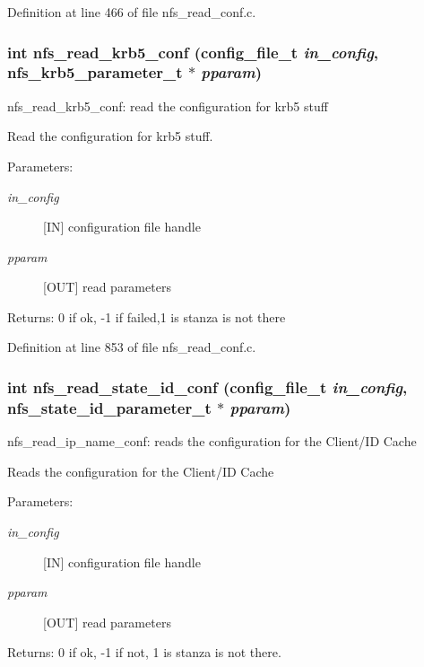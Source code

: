 Definition at line 466 of file nfs\_\-read\_\-conf.c.
\subsubsection{\setlength{\rightskip}{0pt plus 5cm}int nfs\_\-read\_\-krb5\_\-conf (config\_\-file\_\-t {\em in\_\-config}, nfs\_\-krb5\_\-parameter\_\-t $\ast$ {\em pparam})}\label{nfs__read__conf_8c_a8}


nfs\_\-read\_\-krb5\_\-conf: read the configuration for krb5 stuff

Read the configuration for krb5 stuff.

\begin{Desc}
\item[Parameters:]
\begin{description}
\item[{\em in\_\-config}][IN] configuration file handle \item[{\em pparam}][OUT] read parameters\end{description}
\end{Desc}
\begin{Desc}
\item[Returns:]0 if ok, -1 if failed,1 is stanza is not there \end{Desc}


Definition at line 853 of file nfs\_\-read\_\-conf.c.
\subsubsection{\setlength{\rightskip}{0pt plus 5cm}int nfs\_\-read\_\-state\_\-id\_\-conf (config\_\-file\_\-t {\em in\_\-config}, nfs\_\-state\_\-id\_\-parameter\_\-t $\ast$ {\em pparam})}\label{nfs__read__conf_8c_a5}


nfs\_\-read\_\-ip\_\-name\_\-conf: reads the configuration for the Client/ID Cache

Reads the configuration for the Client/ID Cache

\begin{Desc}
\item[Parameters:]
\begin{description}
\item[{\em in\_\-config}][IN] configuration file handle \item[{\em pparam}][OUT] read parameters\end{description}
\end{Desc}
\begin{Desc}
\item[Returns:]0 if ok, -1 if not, 1 is stanza is not there. \end{Desc}


